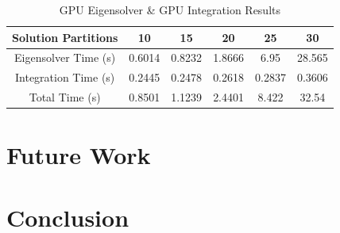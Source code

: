 \documentclass[conference, twoside]{IEEEtran}
\begin{document}
\begin{table}
    \renewcommand{\arraystretch}{1.3} %
    \caption{GPU Eigensolver \& GPU Integration Results}
    \label{gpu-eigensolver-and-integration-results}
    \centering
    \begin{tabular}{c||c|c|c|c|c}
        \hline
        {Solution Partitions} & {10} & {15} & {20} & {25} & {30} \\
        \hline
        \hline
        {Eigensolver Time (s)}              & {0.6014} & {0.8232} & {1.8666} & {6.95}   & {28.565}\\
        {Integration Time (s)}              & {0.2445} & {0.2478} & {0.2618} & {0.2837} & {0.3606}\\
        {Total Time (s)}                    & {0.8501} & {1.1239} & {2.4401} & {8.422}  & {32.54} \\
        \hline
    \end{tabular}
\end{table}

\section{Future Work}


\section{Conclusion}




\end{document}
